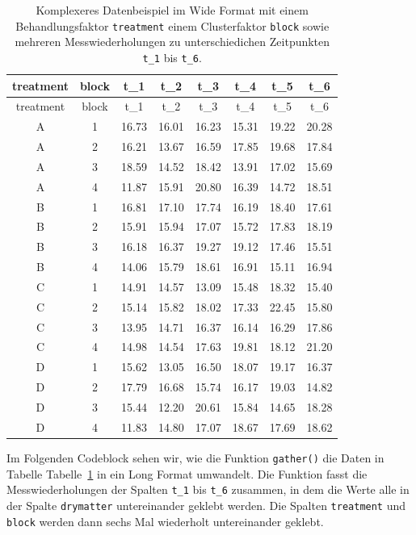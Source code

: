 \documentclass[
  letterpaper,
  DIV=11,
  oneside]{scrreport}
\begin{document}
\hypertarget{tbl-imp-complex-long}{}
\begin{longtable}[]{@{}cccccccc@{}}
\caption{\label{tbl-imp-complex-long}Komplexeres Datenbeispiel im Wide
Format mit einem Behandlungsfaktor \texttt{treatment} einem
Clusterfaktor \texttt{block} sowie mehreren Messwiederholungen zu
unterschiedichen Zeitpunkten \texttt{t\_1} bis
\texttt{t\_6}.}\tabularnewline
\toprule()
treatment & block & t\_1 & t\_2 & t\_3 & t\_4 & t\_5 & t\_6 \\
\midrule()
\endfirsthead
\toprule()
treatment & block & t\_1 & t\_2 & t\_3 & t\_4 & t\_5 & t\_6 \\
\midrule()
\endhead
A & 1 & 16.73 & 16.01 & 16.23 & 15.31 & 19.22 & 20.28 \\
A & 2 & 16.21 & 13.67 & 16.59 & 17.85 & 19.68 & 17.84 \\
A & 3 & 18.59 & 14.52 & 18.42 & 13.91 & 17.02 & 15.69 \\
A & 4 & 11.87 & 15.91 & 20.80 & 16.39 & 14.72 & 18.51 \\
B & 1 & 16.81 & 17.10 & 17.74 & 16.19 & 18.40 & 17.61 \\
B & 2 & 15.91 & 15.94 & 17.07 & 15.72 & 17.83 & 18.19 \\
B & 3 & 16.18 & 16.37 & 19.27 & 19.12 & 17.46 & 15.51 \\
B & 4 & 14.06 & 15.79 & 18.61 & 16.91 & 15.11 & 16.94 \\
C & 1 & 14.91 & 14.57 & 13.09 & 15.48 & 18.32 & 15.40 \\
C & 2 & 15.14 & 15.82 & 18.02 & 17.33 & 22.45 & 15.80 \\
C & 3 & 13.95 & 14.71 & 16.37 & 16.14 & 16.29 & 17.86 \\
C & 4 & 14.98 & 14.54 & 17.63 & 19.81 & 18.12 & 21.20 \\
D & 1 & 15.62 & 13.05 & 16.50 & 18.07 & 19.17 & 16.37 \\
D & 2 & 17.79 & 16.68 & 15.74 & 16.17 & 19.03 & 14.82 \\
D & 3 & 15.44 & 12.20 & 20.61 & 15.84 & 14.65 & 18.28 \\
D & 4 & 11.83 & 14.80 & 17.07 & 18.67 & 17.69 & 18.62 \\
\bottomrule()
\end{longtable}

Im Folgenden Codeblock sehen wir, wie die Funktion \texttt{gather()} die
Daten in Tabelle Tabelle~\ref{tbl-imp-complex-long} in ein Long Format
umwandelt. Die Funktion fasst die Messwiederholungen der Spalten
\texttt{t\_1} bis \texttt{t\_6} zusammen, in dem die Werte alle in der
Spalte \texttt{drymatter} untereinander geklebt werden. Die Spalten
\texttt{treatment} und \texttt{block} werden dann sechs Mal wiederholt
untereinander geklebt.
\end{document}
